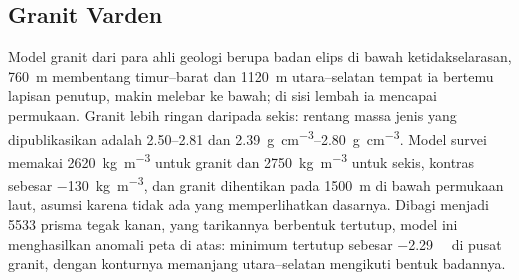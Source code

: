 \begin{omfigure}
\par{}\label{fig:b3:field-lab-methods-3:survey}
\end{omfigure}

\subsection{Granit Varden}

Model granit dari para ahli geologi berupa badan elips di bawah ketidakselarasan,
\qty{760}{m} membentang timur--barat dan \qty{1120}{m}
utara--selatan tempat ia bertemu lapisan penutup, makin melebar ke bawah; di sisi
lembah ia mencapai permukaan. Granit lebih ringan daripada sekis:
rentang massa jenis yang dipublikasikan adalah \numrange{2.50}{2.81} dan
\qtyrange{2.39}{2.80}{g.cm^{-3}}. Model survei memakai
\qty{2620}{kg.m^{-3}} untuk granit dan \qty{2750}{kg.m^{-3}} untuk
sekis, kontras sebesar \qty{-130}{kg.m^{-3}}, dan granit dihentikan pada
\qty{1500}{m} di bawah permukaan laut, asumsi karena tidak ada yang
memperlihatkan dasarnya. Dibagi menjadi \num{5533} prisma tegak kanan,
yang tarikannya berbentuk tertutup, model ini menghasilkan anomali peta di atas: minimum tertutup sebesar
\qty{-2.29}{\milli\gal} di pusat granit, dengan konturnya
memanjang utara--selatan mengikuti bentuk badannya.

